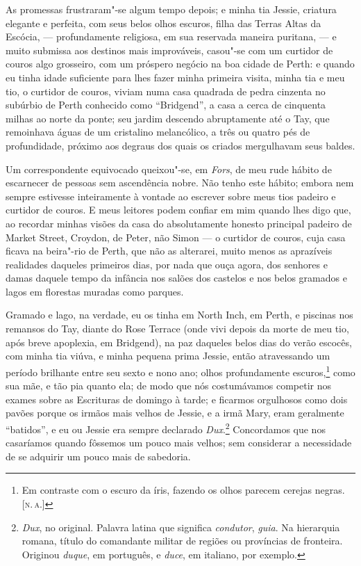 As promessas frustraram"-se algum tempo depois; e minha tia Jessie,
criatura elegante e perfeita, com seus belos olhos escuros, filha das
Terras Altas da Escócia, --- profundamente religiosa, em sua reservada
maneira puritana, --- e muito submissa aos destinos mais improváveis,
casou"-se com um curtidor de couros algo grosseiro, com um próspero
negócio na boa cidade de Perth: e quando eu tinha idade suficiente para
lhes fazer minha primeira visita, minha tia e meu tio, o curtidor de
couros, viviam numa casa quadrada de pedra cinzenta no subúrbio de Perth
conhecido como ``Bridgend'', a casa a cerca de cinquenta milhas ao
norte da ponte; seu jardim descendo abruptamente até o Tay, que
remoinhava águas de um cristalino melancólico, a três ou quatro pés de
profundidade, próximo aos degraus dos quais os criados mergulhavam seus
baldes.

Um correspondente equivocado queixou"-se, em \textit{Fors}, de meu rude
hábito de escarnecer de pessoas sem ascendência nobre. Não tenho este
hábito; embora nem sempre estivesse inteiramente à vontade ao escrever
sobre meus tios padeiro e curtidor de couros. E meus leitores podem
confiar em mim quando lhes digo que, ao recordar minhas visões da casa
do absolutamente honesto principal padeiro de Market Street, Croydon, de
Peter, não Simon --- o curtidor de couros, cuja casa ficava na beira"-rio
de Perth, que não as alterarei, muito menos as aprazíveis realidades
daqueles primeiros dias, por nada que ouça agora, dos senhores e damas
daquele tempo da infância nos salões dos castelos e nos belos gramados e
lagos em florestas muradas como parques.

Gramado e lago, na verdade, eu os tinha em North Inch, em Perth, e
piscinas nos remansos do Tay, diante do Rose Terrace (onde vivi depois
da morte de meu tio, após breve apoplexia, em Bridgend), na paz
daqueles belos dias do verão escocês, com minha tia viúva, e minha
pequena prima Jessie, então atravessando um período brilhante entre seu
sexto e nono ano; olhos profundamente escuros,\footnote{Em contraste com
  o escuro da íris, fazendo os olhos parecem cerejas negras. {[}\textsc{n.\,a.}{]}} como sua mãe, e tão pia quanto ela; de modo que nós
costumávamos competir nos exames sobre as Escrituras de domingo à tarde;
e ficarmos orgulhosos como dois pavões porque os irmãos mais velhos de
Jessie, e a irmã Mary, eram geralmente ``batidos'', e eu ou Jessie era
sempre declarado \textit{Dux}.\footnote{\textit{Dux}, no original. Palavra
  latina que significa \textit{condutor}, \textit{guia}. Na hierarquia romana,
  título do comandante militar de regiões ou províncias de fronteira.
  Originou \textit{duque}, em português, e \textit{duce}, em italiano, por
  exemplo.} Concordamos que nos casaríamos quando
fôssemos um pouco mais velhos; sem considerar a necessidade de se
adquirir um pouco mais de sabedoria.

